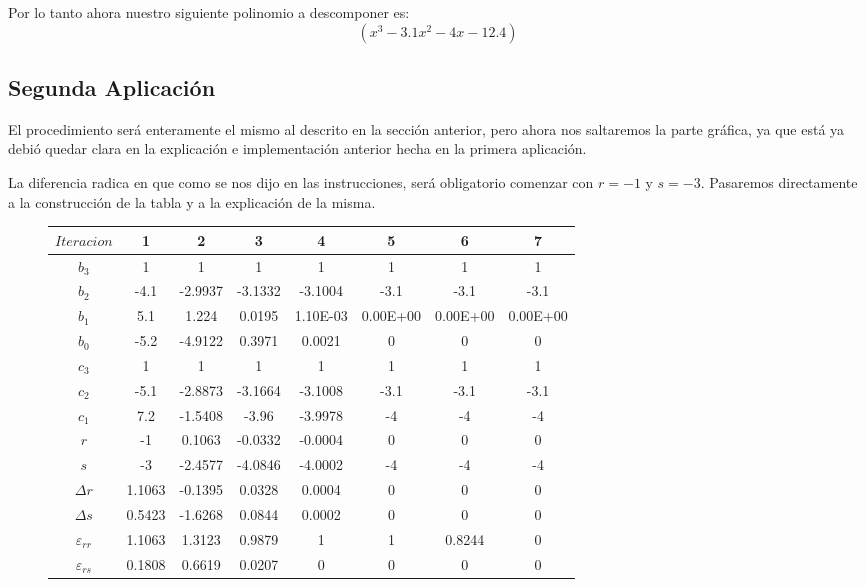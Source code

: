\documentclass{article}
\begin{document}
Por lo tanto ahora nuestro siguiente polinomio a descomponer es: $$(x^3-3.1x^2-4x-12.4)$$


\subsection{Segunda Aplicación}
El procedimiento será enteramente el mismo al descrito en la sección anterior, pero
ahora nos saltaremos la parte gráfica, ya que está ya debió quedar clara en la explicación
e implementación anterior hecha en la primera aplicación.


La diferencia radica en que como se nos dijo en las instrucciones, será obligatorio
comenzar con $r=-1$ y $s=-3$. Pasaremos directamente a la construcción de la tabla
y a la explicación de la misma.
\newpage
\begin{figure*}[h!]
   \centering
   \resizebox{12cm}{!} {
   \begin{tabular}{|c|c|c|c|c|c|c|c|}
       \hline
       $Iteracion$ &   1   &   2   &   3   &   4   &   5   &   6   &   7   \\  \hline
       $b_3$   &   1   &   1   &   1   &   1   &   1   &   1   &   1   \\  \hline
       $b_2$   &   -4.1    &   -2.9937 &   -3.1332 &   -3.1004 &   -3.1    &   -3.1    &   -3.1    \\  \hline
       $b_1$   &   5.1 &   1.224   &   0.0195  &   1.10E-03    &   0.00E+00    &   0.00E+00    &   0.00E+00    \\  \hline
       $b_0$   &   -5.2    &   -4.9122 &   0.3971  &   0.0021  &   0   &   0   &   0   \\  \hline
       $c_3$   &   1   &   1   &   1   &   1   &   1   &   1   &   1   \\  \hline
       $c_2$   &   -5.1    &   -2.8873 &   -3.1664 &   -3.1008 &   -3.1    &   -3.1    &   -3.1    \\  \hline
       $c_1$   &   7.2 &   -1.5408 &   -3.96   &   -3.9978 &   -4  &   -4  &   -4  \\  \hline
       $r$ &   -1  &   0.1063  &   -0.0332 &   -0.0004 &   0   &   0   &   0   \\  \hline
       $s$ &   -3  &   -2.4577 &   -4.0846 &   -4.0002 &   -4  &   -4  &   -4  \\  \hline
       $\varDelta r$   &   1.1063  &   -0.1395 &   0.0328  &   0.0004  &   0   &   0   &   0   \\  \hline
       $\varDelta s$   &   0.5423  &   -1.6268 &   0.0844  &   0.0002  &   0   &   0   &   0   \\  \hline
       $\varepsilon_{rr}$  &   1.1063  &   1.3123  &   0.9879  &   1   &   1   &   0.8244  &   0   \\  \hline
       $\varepsilon_{rs}$  &   0.1808  &   0.6619  &   0.0207  &   0   &   0   &   0   &   0   \\  \hline
   \end{tabular}
   }
\end{figure*}
\end{document}
